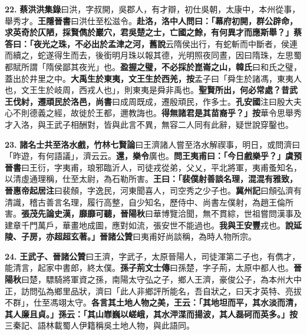 \textbf{22.} \textbf{蔡洪}{\footnotesize \textbf{洪集錄}曰洪，字叔開，吳郡人，有才辯，初仕吳朝，太康中，本州從事，舉秀才。\textbf{王隱晉書}曰洪仕至松滋令。}\textbf{赴洛，洛中人問曰：「幕府初開，群公辟命，求英奇於仄陋，採賢儁於巖穴，君吳楚之士，亡國之餘，有何異才而應斯舉？」蔡答曰：「夜光之珠，不必出於孟津之河，}{\footnotesize \textbf{舊說}云隋侯出行，有蛇斬而中斷者，侯連而續之，蛇遂得生而去，後銜明月珠以報其德，光明照夜同晝，因曰隋珠，左思蜀都賦所謂「隋侯鄙其夜光」也。}\textbf{盈握之璧，不必採於崑崙之山，}{\footnotesize \textbf{韓氏}曰和氏之璧，蓋出於井里之中。}\textbf{大禹生於東夷，文王生於西羌，}{\footnotesize \textbf{按}孟子曰「舜生於諸馮，東夷人也，文王生於岐周，西戎人也」，則東夷是舜非禹也。}\textbf{聖賢所出，何必常處？昔武王伐紂，遷頑民於洛邑，}{\footnotesize \textbf{尚書}曰成周既成，遷殷頑民，作多士。\textbf{孔安國}注曰殷大夫心不則德義之經，故徙於王都，邇教誨也。}\textbf{得無諸君是其苗裔乎？」}{\footnotesize \textbf{按}華令思舉秀才入洛，與王武子相酬對，皆與此言不異，無容二人同有此辭，疑世說穿鑿也。}

\textbf{23.} \textbf{諸名士共至洛水戲，}{\footnotesize \textbf{竹林七賢論}曰王濟諸人嘗至洛水解禊事，明日，或問濟曰「昨遊，有何語議」，濟云云。}\textbf{還，樂令}{\footnotesize 廣也。}\textbf{問王夷甫曰：「今日戲樂乎？」}{\footnotesize \textbf{虞預晉書}曰王衍，字夷甫，琅邪臨沂人，司徒戎從弟，父乂，平北將軍，夷甫蚤知名，以清虛通理稱，仕至太尉，為石勒所害。}\textbf{王曰：「裴僕射善談名理，混混有雅致，}{\footnotesize \textbf{晉惠帝起居注}曰裴頠，字逸民，河東聞喜人，司空秀之少子也。\textbf{冀州記}曰頠弘濟有清識，稽古善言名理，履行高整，自少知名，歷侍中、尚書左僕射，為趙王倫所害。}\textbf{張茂先論史漢，靡靡可聽，}{\footnotesize \textbf{晉陽秋}曰華博覽洽聞，無不貫綜，世祖嘗問漢事及建章千門萬戶，華畫地成圖，應對如流，張安世不能過也。}\textbf{我與王安豐}{\footnotesize 戎也。}\textbf{說延陵、子房，亦超超玄著。」}{\footnotesize \textbf{晉諸公贊}曰夷甫好尚談稱，為時人物所宗。}

\textbf{24.} \textbf{王武子、}{\footnotesize \textbf{晉諸公贊}曰王濟，字武子，太原晉陽人，司徒渾第二子也，有儁才，能清言，起家中書郎，終太僕。}\textbf{孫子荊}{\footnotesize \textbf{文士傳}曰孫楚，字子荊，太原中都人也。\textbf{晉陽秋}曰楚，驃騎將軍資之孫，南陽太守弘之子，鄉人王濟，豪俊公子，為本州大中正，訪問弘為鄉里品狀，濟曰「此人非鄉評所能名，吾自狀之，曰天才英特、亮拔不群」，仕至馮翊太守。}\textbf{各言其土地人物之美，王云：「其地坦而平，其水淡而清，其人廉且貞。」孫云：「其山㠑巍以嵯峨，其水㳌渫而揚波，其人磊砢而英多。」}{\footnotesize \textbf{按}三秦記、語林載蜀人伊籍稱吳土地人物，與此語同。}

